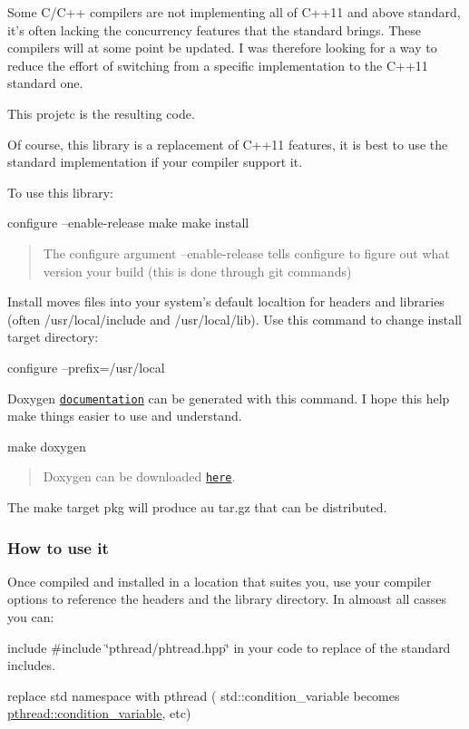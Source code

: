 Some C/\+C++ compilers are not implementing all of C++11 and above standard, it's often lacking the concurrency features that the standard brings. These compilers will at some point be updated. I was therefore looking for a way to reduce the effort of switching from a specific implementation to the C++11 standard one.

This projetc is the resulting code.

Of course, this library is a replacement of C++11 features, it is best to use the standard implementation if your compiler support it.

To use this library\+: \begin{DoxyVerb}configure --enable-release
make
make install
\end{DoxyVerb}


\begin{quote}
The configure argument --enable-\/release tells configure to figure out what version your build (this is done through {\ttfamily git} commands) \end{quote}
Install moves files into your system's default localtion for headers and libraries (often /usr/local/include and /usr/local/lib). Use this command to change install target directory\+: \begin{DoxyVerb}configure --prefix=/usr/local
\end{DoxyVerb}


Doxygen \href{http://herbertkoelman.github.io/cpp-pthread/doc/html/}{\tt documentation} can be generated with this command. I hope this help make things easier to use and understand. \begin{DoxyVerb}make doxygen
\end{DoxyVerb}


\begin{quote}
Doxygen can be downloaded \href{http://www.stack.nl/~dimitri/doxygen/index.html}{\tt here}. \end{quote}


The {\ttfamily make} target {\ttfamily pkg} will produce au tar.\+gz that can be distributed.

\subsubsection*{How to use it}

Once compiled and installed in a location that suites you, use your compiler options to reference the headers and the library directory. In almoast all casses you can\+:
\begin{DoxyItemize}
\item include {\ttfamily \#include \char`\"{}pthread/phtread.\+hpp\char`\"{}} in your code to replace of the standard includes.
\item replace {\ttfamily std} namespace with {\ttfamily pthread} ( std\+::condition\+\_\+variable becomes \hyperlink{classpthread_1_1condition__variable}{pthread\+::condition\+\_\+variable}, etc)
\end{DoxyItemize}

